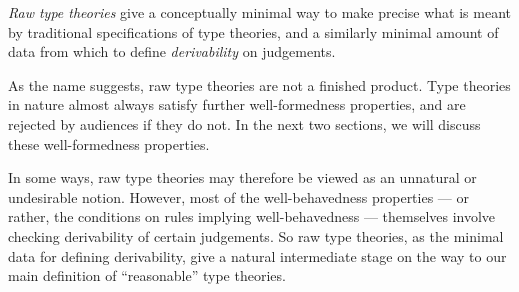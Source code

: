 \emph{Raw type theories} give a conceptually minimal way to make precise what is meant by traditional specifications of type theories, and a similarly minimal amount of data from which to define \emph{derivability} on judgements.

As the name suggests, raw type theories are not a finished product.
%
Type theories in nature almost always satisfy further well-formedness properties, and are rejected by audiences if they do not.
%
In the next two sections, we will discuss these well-formedness properties.

In some ways, raw type theories may therefore be viewed as an unnatural or undesirable notion.
%
However, most of the well-behavedness properties --- or rather, the conditions on rules implying well-behavedness --- themselves involve checking derivability of certain judgements.
%
So raw type theories, as the minimal data for defining derivability, give a natural intermediate stage on the way to our main definition of “reasonable” type theories.

